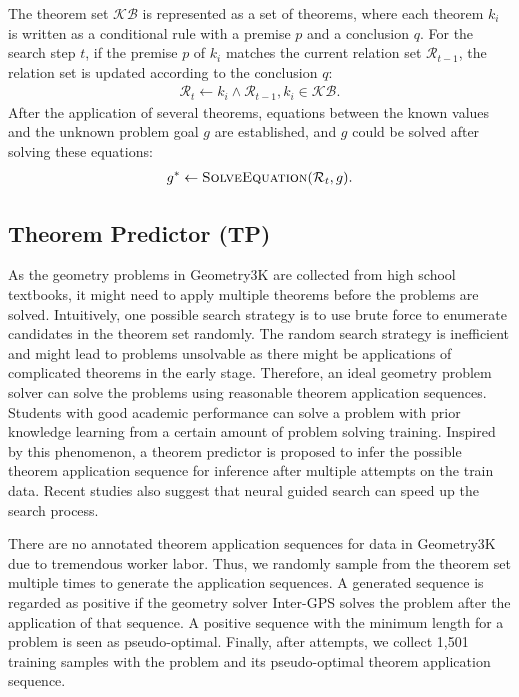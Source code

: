 \documentclass[11pt,a4paper]{article}
\begin{document}
The theorem set $\mathcal{KB}$ is represented as a set of theorems, where each theorem $k_i$ is written as a conditional rule with a premise $p$ and a conclusion $q$. For the search step $t$, if the premise $p$ of $k_i$ matches the current relation set $\mathcal{R}_{t-1}$, the relation set is updated according to the conclusion $q$:
\begin{equation}
\begin{split}
    \mathcal{R}_{t} \gets k_i \land \mathcal{R}_{t-1}, k_i \in \mathcal{KB}.
\end{split}
\end{equation}
After the application of several theorems, equations between the known values and the unknown problem goal $g$ are established, and $g$ could be solved after solving these equations:
\begin{equation}
\begin{split}
    g^* \gets \text{\scshape SolveEquation}(\mathcal{R}_t, g).
\end{split}
\end{equation}

\subsection{Theorem Predictor (TP)}
As the geometry problems in Geometry3K are collected from high school textbooks, it might need to apply multiple theorems before the problems are solved. Intuitively, one possible search strategy is to use brute force to enumerate candidates in the theorem set randomly. The random search strategy is inefficient and might lead to problems unsolvable as there might be applications of complicated theorems in the early stage. Therefore, an ideal geometry problem solver can solve the problems using reasonable theorem application sequences. Students with good academic performance can solve a problem with prior knowledge learning from a certain amount of problem solving training. Inspired by this phenomenon, a theorem predictor is proposed to infer the possible theorem application sequence for inference after multiple attempts on the train data. Recent studies \cite{loos2017deep,balunovic2018learning} also suggest that neural guided search can speed up the search process.

There are no annotated theorem application sequences for data in Geometry3K due to tremendous worker labor. 
Thus, we randomly sample from the theorem set multiple times to generate the application sequences.
A generated sequence is regarded as positive if the geometry solver Inter-GPS solves the problem after the application of that sequence. A positive sequence with the minimum length for a problem is seen as pseudo-optimal. Finally, after attempts, we collect 1,501 training samples with the problem and its pseudo-optimal theorem application sequence. 
\end{document}
